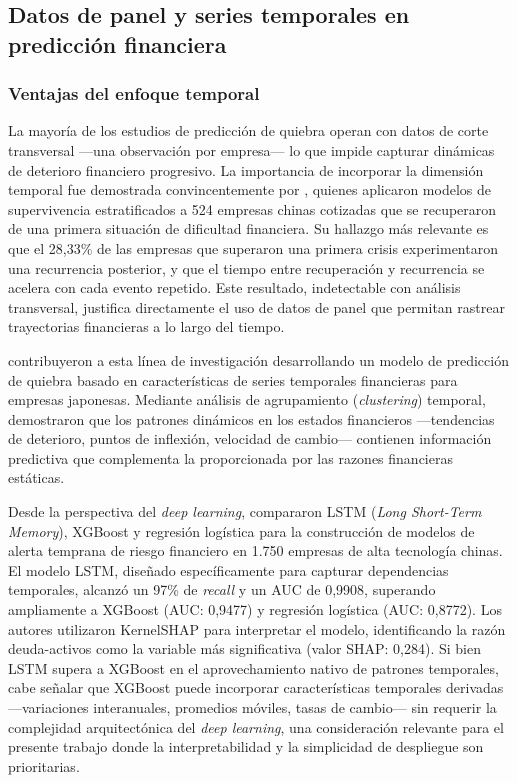 \documentclass[12pt, letterpaper]{article}
\begin{document}
\subsection{Datos de panel y series temporales en predicci\'on financiera}
\label{sec:panel}

\subsubsection{Ventajas del enfoque temporal}

La mayor\'ia de los estudios de predicci\'on de quiebra operan con datos de corte transversal ---una observaci\'on por empresa--- lo que impide capturar din\'amicas de deterioro financiero progresivo. La importancia de incorporar la dimensi\'on temporal fue demostrada convincentemente por \citet{Zhou2022}, quienes aplicaron modelos de supervivencia estratificados a 524 empresas chinas cotizadas que se recuperaron de una primera situaci\'on de dificultad financiera. Su hallazgo m\'as relevante es que el 28,33\% de las empresas que superaron una primera crisis experimentaron una recurrencia posterior, y que el tiempo entre recuperaci\'on y recurrencia se acelera con cada evento repetido. Este resultado, indetectable con an\'alisis transversal, justifica directamente el uso de datos de panel que permitan rastrear trayectorias financieras a lo largo del tiempo.

\citet{Otsuki2022} contribuyeron a esta l\'inea de investigaci\'on desarrollando un modelo de predicci\'on de quiebra basado en caracter\'isticas de series temporales financieras para empresas japonesas. Mediante an\'alisis de agrupamiento (\textit{clustering}) temporal, demostraron que los patrones din\'amicos en los estados financieros ---tendencias de deterioro, puntos de inflexi\'on, velocidad de cambio--- contienen informaci\'on predictiva que complementa la proporcionada por las razones financieras est\'aticas.

Desde la perspectiva del \textit{deep learning}, \citet{Zhang2025} compararon LSTM (\textit{Long Short-Term Memory}), XGBoost y regresi\'on log\'istica para la construcci\'on de modelos de alerta temprana de riesgo financiero en 1.750 empresas de alta tecnolog\'ia chinas. El modelo LSTM, dise\~nado espec\'ificamente para capturar dependencias temporales, alcanz\'o un 97\% de \textit{recall} y un AUC de 0,9908, superando ampliamente a XGBoost (AUC: 0,9477) y regresi\'on log\'istica (AUC: 0,8772). Los autores utilizaron KernelSHAP para interpretar el modelo, identificando la raz\'on deuda-activos como la variable m\'as significativa (valor SHAP: 0,284). Si bien LSTM supera a XGBoost en el aprovechamiento nativo de patrones temporales, cabe se\~nalar que XGBoost puede incorporar caracter\'isticas temporales derivadas ---variaciones interanuales, promedios m\'oviles, tasas de cambio--- sin requerir la complejidad arquitect\'onica del \textit{deep learning}, una consideraci\'on relevante para el presente trabajo donde la interpretabilidad y la simplicidad de despliegue son prioritarias.
\end{document}
